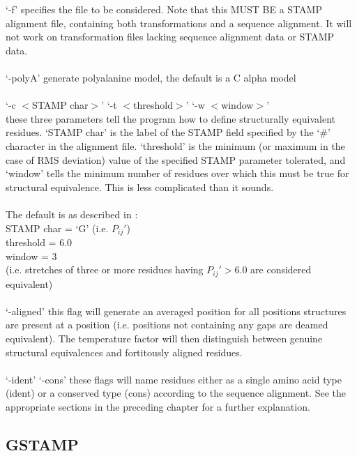 `-f' specifies the file to be considered.  Note that this MUST BE 
  a STAMP alignment file, containing both transformations and a
  sequence alignment.  It will not work on transformation files
  lacking sequence alignment data or STAMP data.\\
\\
`-polyA' generate  polyalanine model, the default is a C alpha
   model\\
\\
`-c $<$STAMP char$>$' `-t $<$threshold$>$' `-w $<$window$>$'\\
  these three parameters tell the program how to define structurally
  equivalent residues.  `STAMP char' is the label of the STAMP field
  specified by the `\#' character  in the alignment file.
  `threshold' is the minimum (or maximum in the case of RMS deviation)
  value of the specified STAMP parameter tolerated, and `window' tells
  the minimum number of residues over which this must be true for 
  structural equivalence.  This is less complicated than it sounds.\\
\\
  The default is as described in \cite{rb92b}:\\  
   STAMP char = `G' (i.e. $P_{ij}{\prime}$)\\
   threshold  = 6.0\\
   window     = 3 \\
   (i.e. stretches of three or more residues having $P_{ij}{\prime} > 6.0$
     are considered equivalent)\\
\\
`-aligned' this flag will generate an averaged position for all positions
  structures are present at a position (i.e. positions not containing any 
  gaps are deamed equivalent).   The temperature factor will then distinguish
  between genuine structural equivalences and fortitously aligned residues.\\
\\
`-ident' `-cons'  these flags will name residues either as a single amino acid
  type (ident) or a conserved type (cons) according to the sequence alignment.
  See the appropriate sections in the preceding chapter for a further explanation.


\subsection{GSTAMP}

